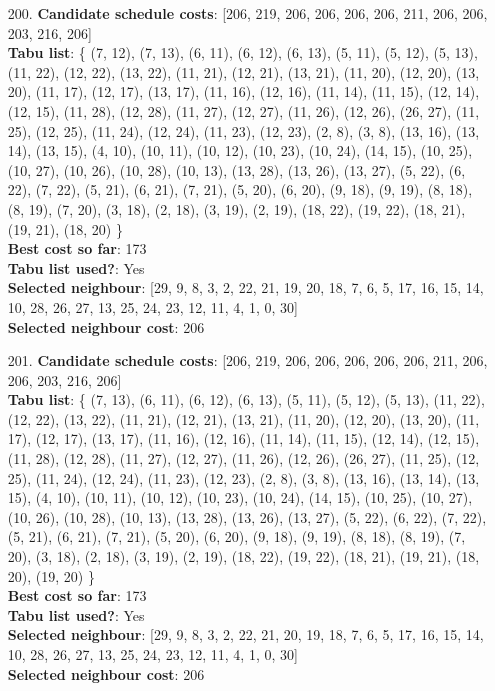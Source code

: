 \documentclass[fleqn]{article}
\begin{document}
\begin{itemize}
    \item[200.] \textbf{Candidate schedule costs}: [206, 219, 206, 206, 206, 206, 211, 206, 206, 203, 216, 206] \\
    \textbf{Tabu list}: \{ (7, 12), (7, 13), (6, 11), (6, 12), (6, 13), (5, 11), (5, 12), (5, 13), (11, 22), (12, 22), (13, 22), (11, 21), (12, 21), (13, 21), (11, 20), (12, 20), (13, 20), (11, 17), (12, 17), (13, 17), (11, 16), (12, 16), (11, 14), (11, 15), (12, 14), (12, 15), (11, 28), (12, 28), (11, 27), (12, 27), (11, 26), (12, 26), (26, 27), (11, 25), (12, 25), (11, 24), (12, 24), (11, 23), (12, 23), (2, 8), (3, 8), (13, 16), (13, 14), (13, 15), (4, 10), (10, 11), (10, 12), (10, 23), (10, 24), (14, 15), (10, 25), (10, 27), (10, 26), (10, 28), (10, 13), (13, 28), (13, 26), (13, 27), (5, 22), (6, 22), (7, 22), (5, 21), (6, 21), (7, 21), (5, 20), (6, 20), (9, 18), (9, 19), (8, 18), (8, 19), (7, 20), (3, 18), (2, 18), (3, 19), (2, 19), (18, 22), (19, 22), (18, 21), (19, 21), (18, 20) \} \\
    \textbf{Best cost so far}: 173 \\
    \textbf{Tabu list used?}: Yes \\
    \textbf{Selected neighbour}: [29, 9, 8, 3, 2, 22, 21, 19, 20, 18, 7, 6, 5, 17, 16, 15, 14, 10, 28, 26, 27, 13, 25, 24, 23, 12, 11, 4, 1, 0, 30] \\
    \textbf{Selected neighbour cost}: 206
      

    \item[201.] \textbf{Candidate schedule costs}: [206, 219, 206, 206, 206, 206, 206, 211, 206, 206, 203, 216, 206] \\
    \textbf{Tabu list}: \{ (7, 13), (6, 11), (6, 12), (6, 13), (5, 11), (5, 12), (5, 13), (11, 22), (12, 22), (13, 22), (11, 21), (12, 21), (13, 21), (11, 20), (12, 20), (13, 20), (11, 17), (12, 17), (13, 17), (11, 16), (12, 16), (11, 14), (11, 15), (12, 14), (12, 15), (11, 28), (12, 28), (11, 27), (12, 27), (11, 26), (12, 26), (26, 27), (11, 25), (12, 25), (11, 24), (12, 24), (11, 23), (12, 23), (2, 8), (3, 8), (13, 16), (13, 14), (13, 15), (4, 10), (10, 11), (10, 12), (10, 23), (10, 24), (14, 15), (10, 25), (10, 27), (10, 26), (10, 28), (10, 13), (13, 28), (13, 26), (13, 27), (5, 22), (6, 22), (7, 22), (5, 21), (6, 21), (7, 21), (5, 20), (6, 20), (9, 18), (9, 19), (8, 18), (8, 19), (7, 20), (3, 18), (2, 18), (3, 19), (2, 19), (18, 22), (19, 22), (18, 21), (19, 21), (18, 20), (19, 20) \} \\
    \textbf{Best cost so far}: 173 \\
    \textbf{Tabu list used?}: Yes \\
    \textbf{Selected neighbour}: [29, 9, 8, 3, 2, 22, 21, 20, 19, 18, 7, 6, 5, 17, 16, 15, 14, 10, 28, 26, 27, 13, 25, 24, 23, 12, 11, 4, 1, 0, 30] \\
    \textbf{Selected neighbour cost}: 206
      


\end{itemize}
\end{document}
